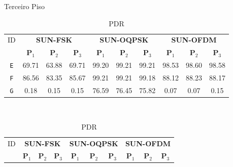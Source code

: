 \begin{table}[H]
      \caption{Terceiro Piso}
      \begin{subtable}{\textwidth}
            \begin{center}
                  \begin{tabular}{|c|c|c|c|c|c|c|c|c|c|}
                        \hline
                        ID         & \multicolumn{3}{c|}{\textbf{SUN-FSK}} & \multicolumn{3}{c|}{\textbf{SUN-OQPSK}} & \multicolumn{3}{c|}{\textbf{SUN-OFDM}}                                                                                                       \\ \cline{2-10}
                                   & \textbf{P$_1$}                        & \textbf{P$_2$}                          & \textbf{P$_3$}                         & \textbf{P$_1$} & \textbf{P$_2$} & \textbf{P$_3$} & \textbf{P$_1$} & \textbf{P$_2$} & \textbf{P$_3$} \\ \hline
                        \texttt{E} & 69.71                                 & 63.88                                   & 69.71                                  & 99.20          & 99.21          & 99.21          & 98.53          & 98.60          & 98.58          \\ \hline
                        \texttt{F} & 86.56                                 & 83.35                                   & 85.67                                  & 99.21          & 99.21          & 99.18          & 88.12          & 88.23          & 88.17          \\ \hline
                        \texttt{G} & 0.18                                  & 0.15                                    & 0.15                                   & 76.59          & 76.45          & 75.82          & 0.07           & 0.07           & 0.15           \\ \hline
                  \end{tabular}
                  \caption{PDR}
                  \label{table:pdr3}
            \end{center}
      \end{subtable}%
      \\
      \par\bigskip
      \begin{subtable}{\textwidth}
            \begin{center}
                  \begin{tabular}{|c|c|c|c|c|c|c|c|c|c|}
                        \hline
                        ID         & \multicolumn{3}{c|}{\textbf{SUN-FSK}} & \multicolumn{3}{c|}{\textbf{SUN-OQPSK}} & \multicolumn{3}{c|}{\textbf{SUN-OFDM}}                                                                                                       \\ \cline{2-10}
                                   & \textbf{P$_1$}                        & \textbf{P$_2$}                          & \textbf{P$_3$}                         & \textbf{P$_1$} & \textbf{P$_2$} & \textbf{P$_3$} & \textbf{P$_1$} & \textbf{P$_2$} & \textbf{P$_3$} \\ \hline


\end{tabular}
\end{center}
\end{subtable}
\end{table}
